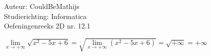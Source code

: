 \documentclass[a4paper]{article}
\newcommand{\llim}{\lim\limits}
\begin{document}
  
\noindent \large Auteur: CouldBeMathijs \\
\noindent \large Studierichting: Informatica\\
\noindent \large Oefeningenreeks 2D nr. 12.1\\

\medskip

\normalsize

$\llim_{x \rightarrow + \infty} \sqrt{x^2-5x+6} = \sqrt{ \llim_{x \rightarrow + \infty} \left(x^2-5x+6\right)} = \sqrt{+\infty} = + \infty$

\begin{thebibliography}{999}
\end{thebibliography}
\end{document}
